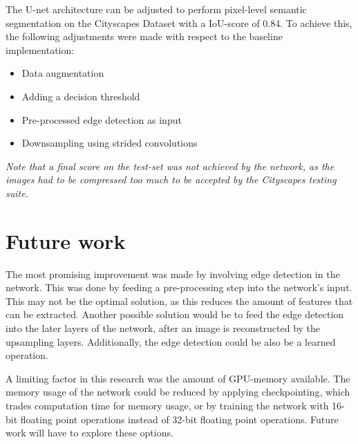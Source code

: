 The U-net architecture can be adjusted to perform pixel-level semantic segmentation on the Cityscapes Dataset with a IoU-score of 0.84. To achieve this, the following adjustments were made with respect to the baseline implementation:
\begin{itemize}
	\item Data augmentation
	\item Adding a decision threshold
	\item Pre-processed edge detection as input
	\item Downsampling using strided convolutions
\end{itemize}
\textit{Note that a final score on the test-set was not achieved by the network, as the images had to be compressed too much to be accepted by the Cityscapes testing suite.}

\section{Future work}
The most promising improvement was made by involving edge detection in the network. This was done by feeding a pre-processing step into the network's input. This may not be the optimal solution, as this reduces the amount of features that can be extracted. Another possible solution would be to feed the edge detection into the later layers of the network, after an image is reconstructed by the upsampling layers. Additionally, the edge detection could be also be a learned operation.

A limiting factor in this research was the amount of GPU-memory available. The memory usage of the network could be reduced by applying checkpointing, which trades computation time for memory usage, or by training the network with 16-bit floating point operations instead of 32-bit floating point operations. Future work will have to explore these options.
